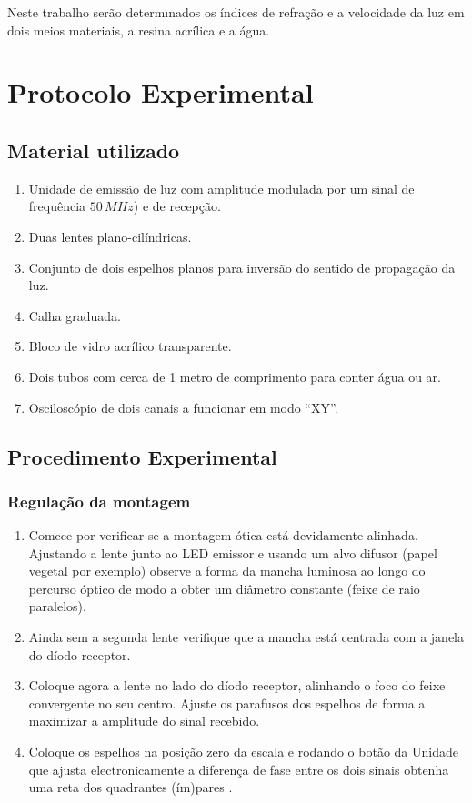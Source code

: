 \documentclass[a4paper,12pt]{article}      %
\begin{document}
 Neste trabalho serão  determınados os índices de refração e a velocidade da
luz em  dois meios materiais, a resina acrílica e a água. 
 


\newpage
\section{\sf Protocolo Experimental}
\subsection{\sf Material utilizado}

\begin{enumerate}
\setlength{\itemsep}{0mm}
\item Unidade de emissão de luz  com amplitude modulada por um sinal de frequência $50\,MHz$) e de recepção.
\item Duas lentes plano-cilíndricas.
\item Conjunto de dois espelhos planos para inversão do sentido de propagação da luz.
\item Calha graduada.  
\item Bloco de vidro acrílico transparente.
\item Dois tubos com cerca de 1 metro de comprimento para conter água ou ar. 
\item Osciloscópio de dois canais a funcionar em modo “XY”.
\end{enumerate}

\subsection{\sf Procedimento Experimental}
\subsubsection{\sf Regulação da montagem}
 
\begin{enumerate}
\setlength{\itemsep}{0mm}
\item Comece por verificar se a montagem ótica está devidamente alinhada. Ajustando a lente junto ao LED emissor e usando um alvo difusor (papel vegetal por exemplo) observe a forma da mancha 
luminosa ao longo do percurso óptico  de modo a obter um diâmetro constante (feixe de raio paralelos). 
\item Ainda sem a segunda lente verifique que a mancha está centrada com  a janela do 
díodo receptor. 
\item Coloque agora a lente no lado do díodo receptor, alinhando o foco do feixe convergente no seu centro. 
Ajuste os parafusos dos espelhos de forma a maximizar a amplitude do sinal 
recebido.
\item Coloque os espelhos na posição zero da escala e rodando o botão da Unidade que ajusta electronicamente a diferença de fase entre os dois sinais obtenha uma reta dos quadrantes (ím)pares . 
\end{enumerate}
\end{document}
